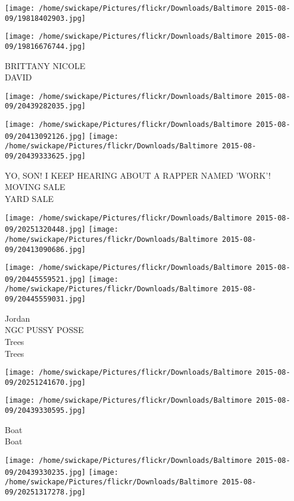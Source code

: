\documentclass[10pt,letterpaper]{article}
\begin{document}
\texttt{[image: /home/swickape/Pictures/flickr/Downloads/Baltimore 2015-08-09/19818402903.jpg]}

\vspace{0.25in}
\texttt{[image: /home/swickape/Pictures/flickr/Downloads/Baltimore 2015-08-09/19816676744.jpg]}

BRITTANY NICOLE\\
DAVID
\pagebreak

\texttt{[image: /home/swickape/Pictures/flickr/Downloads/Baltimore 2015-08-09/20439282035.jpg]}

\vspace{0.25in}
\texttt{[image: /home/swickape/Pictures/flickr/Downloads/Baltimore 2015-08-09/20413092126.jpg]}
\texttt{[image: /home/swickape/Pictures/flickr/Downloads/Baltimore 2015-08-09/20439333625.jpg]}

YO, SON!  I KEEP HEARING ABOUT A RAPPER NAMED 'WORK'!\\
MOVING SALE\\
YARD SALE
\pagebreak

\texttt{[image: /home/swickape/Pictures/flickr/Downloads/Baltimore 2015-08-09/20251320448.jpg]}
\texttt{[image: /home/swickape/Pictures/flickr/Downloads/Baltimore 2015-08-09/20413090686.jpg]}

\texttt{[image: /home/swickape/Pictures/flickr/Downloads/Baltimore 2015-08-09/20445559521.jpg]}
\texttt{[image: /home/swickape/Pictures/flickr/Downloads/Baltimore 2015-08-09/20445559031.jpg]}

Jordan\\
NGC PUSSY POSSE\\
Trees\\
Trees
\pagebreak

\texttt{[image: /home/swickape/Pictures/flickr/Downloads/Baltimore 2015-08-09/20251241670.jpg]}

\vspace{0.25in}
\texttt{[image: /home/swickape/Pictures/flickr/Downloads/Baltimore 2015-08-09/20439330595.jpg]}

Boat\\
Boat
\pagebreak

\texttt{[image: /home/swickape/Pictures/flickr/Downloads/Baltimore 2015-08-09/20439330235.jpg]}
\texttt{[image: /home/swickape/Pictures/flickr/Downloads/Baltimore 2015-08-09/20251317278.jpg]}
\end{document}
